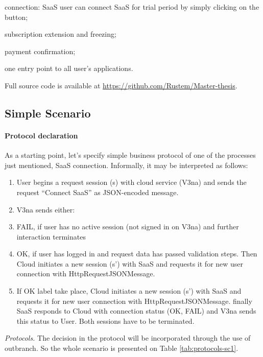 \documentclass{llncs}
\begin{document}
\begin{compactitem}
\item  connection: SaaS user can connect SaaS for trial period by simply clicking on the button;

\item  subscription extension and freezing;

\item  payment confirmation;

\item one entry point to all user's applications.
\end{compactitem}
Full source  code is available at \url{https://github.com/Rustem/Master-thesis}.

\subsection{Simple Scenario}
\paragraph{Protocol declaration} As a starting point, let's specify simple business protocol of one of the processes just mentioned, SaaS connection. Informally, it may be interpreted as follows:
\begin{enumerate}
\item  User begins a request session (s) with cloud service (V3na) and sends the request ``Connect SaaS'' as JSON-encoded message.

\item  V3na sends either:

\item  FAIL, if user has no active session (not signed in on V3na) and further interaction terminates 

\item  OK, if user has logged in and request data has passed validation steps. Then Cloud initiates a new session (s') with SaaS and requests it for new user connection with HttpRequestJSONMessage.

\item  If OK label take place, Cloud initiates a new session (s') with SaaS and requests it for new user connection with HttpRequestJSONMessage. finally SaaS responds to Cloud with connection status (OK, FAIL) and V3na sends this status to User. Both sessions have to be terminated.
\end{enumerate}

\textit{Protocols.} The decision in the protocol will be incorporated through the use of outbranch. So the whole scenario is presented on Table \ref{tab:protocols-sc1}.
\end{document}
